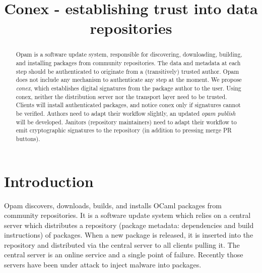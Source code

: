 \documentclass[nocopyrightspace]{sigplanconf}
\begin{document}
\setlength{\pdfpageheight}{\paperheight}
\setlength{\pdfpagewidth}{\paperwidth}

\title{Conex - establishing trust into data repositories}


\date{}

\maketitle

\begin{abstract}
  Opam is a software update system, responsible for discovering, downloading, building, and installing packages from community repositories.
  The data and metadata at each step should be authenticated to originate from a (transitively) trusted author.
  Opam does not include any mechanism to authenticate any step at the moment.
  We propose \emph{conex}, which establishes digital signatures from the package author to the user.
  Using conex, neither the distribution server nor the transport layer need to be trusted.
  Clients will install authenticated packages, and notice conex only if signatures cannot be verified.
  Authors need to adapt their workflow slightly, an updated \emph{opam publish} will be developed.
  Janitors (repository maintainers) need to adapt their workflow to emit cryptographic signatures to the repository (in addition to pressing merge PR buttons).
\end{abstract}

\section{Introduction}
Opam discovers, downloads, builds, and installs OCaml packages from community repositories.
It is a software update system which relies on a central server which distributes a repository (package metadata: dependencies and build instructions) of packages.
When a new package is released, it is inserted into the repository and distributed via the central server to all clients pulling it.
The central server is an online service and a single point of failure.
Recently those servers have been under attack \cite{adobe,apache2,apache1,opera,kernel,cabal,kernelorg,debian,freebsd,php3,savannah,maven,savannah2,npm,php,phpmyadmin,php2,github,ocamlforge,redhatssh,gentoo,rubygems,fedora,wordpress} to inject malware into packages.
\end{document}
